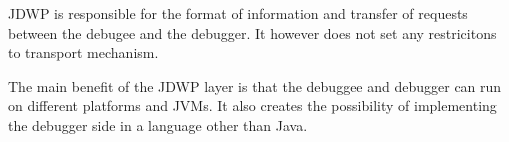 \documentclass[..thesis.tex]{subfiles}
\begin{document}
JDWP is responsible for the format of information and transfer of requests between the debugee and the debugger.
It however does not set any restricitons to transport mechanism.
\cite{oracle_jpda_jdwp}

The main benefit of the JDWP layer is that the debuggee and debugger can run on different platforms and JVMs.
It also creates the possibility of implementing the debugger side in a language other than Java.
\end{document}
